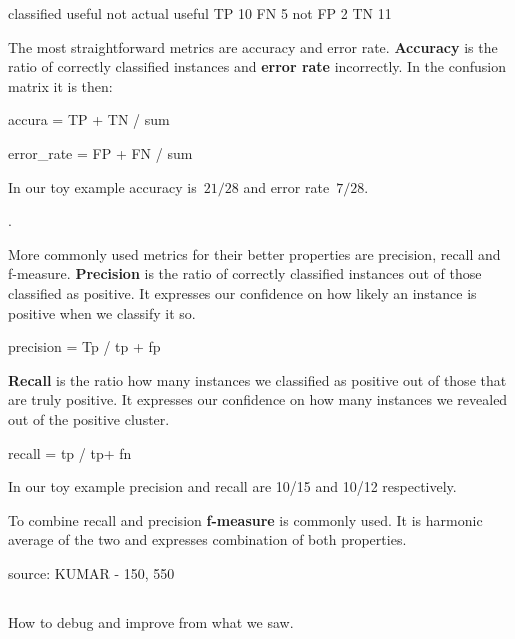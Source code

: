 \begin{code}
        classified    useful       not
actual
useful                TP 10        FN  5
not                   FP  2        TN  11
\end{code}


The most straightforward metrics are accuracy and error rate.
{\bf Accuracy} is the ratio of correctly classified instances and {\bf error rate} incorrectly.
In the confusion matrix it is then:



accura = TP + TN / sum

error\_rate = FP + FN / sum

In our toy example accuracy is~$21/28$ and error rate~$7/28$.

.

More commonly used metrics for their better properties are precision, recall and f-measure.
{\bf Precision} is the ratio of correctly classified instances out of those classified as positive.
It expresses our confidence on how likely an instance is positive when we classify it so.

precision = Tp / tp + fp

{\bf Recall} is the ratio how many instances we classified as positive out of those that are truly positive.
It expresses our confidence on how many instances we revealed out of the positive cluster.

recall = tp / tp+ fn

In our toy example precision and recall are 10/15 and 10/12 respectively.

To combine recall and precision {\bf f-measure} is commonly used.
It is harmonic average of the two and expresses combination of both properties.



{source: KUMAR - 150, 550}




\subsection{}

\subsection{}

How to debug and improve from what we saw.

\subsection{}
